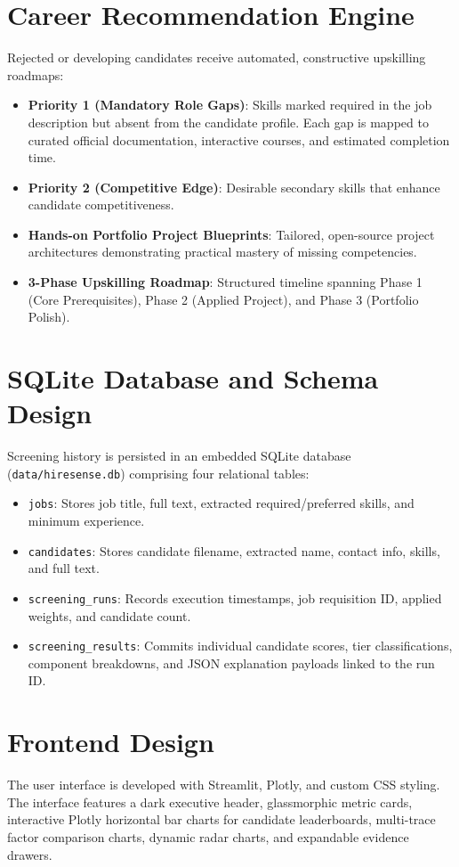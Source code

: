 \documentclass[12pt,a4paper]{report}
\begin{document}
\section{Career Recommendation Engine}
Rejected or developing candidates receive automated, constructive upskilling roadmaps:
\begin{itemize}
    \item \textbf{Priority 1 (Mandatory Role Gaps)}: Skills marked required in the job description but absent from the candidate profile. Each gap is mapped to curated official documentation, interactive courses, and estimated completion time.
    \item \textbf{Priority 2 (Competitive Edge)}: Desirable secondary skills that enhance candidate competitiveness.
    \item \textbf{Hands-on Portfolio Project Blueprints}: Tailored, open-source project architectures demonstrating practical mastery of missing competencies.
    \item \textbf{3-Phase Upskilling Roadmap}: Structured timeline spanning Phase 1 (Core Prerequisites), Phase 2 (Applied Project), and Phase 3 (Portfolio Polish).
\end{itemize}

\section{SQLite Database and Schema Design}
Screening history is persisted in an embedded SQLite database (\texttt{data/hiresense.db}) comprising four relational tables:
\begin{itemize}
    \item \texttt{jobs}: Stores job title, full text, extracted required/preferred skills, and minimum experience.
    \item \texttt{candidates}: Stores candidate filename, extracted name, contact info, skills, and full text.
    \item \texttt{screening\_runs}: Records execution timestamps, job requisition ID, applied weights, and candidate count.
    \item \texttt{screening\_results}: Commits individual candidate scores, tier classifications, component breakdowns, and JSON explanation payloads linked to the run ID.
\end{itemize}

\section{Frontend Design}
The user interface is developed with Streamlit, Plotly, and custom CSS styling. The interface features a dark executive header, glassmorphic metric cards, interactive Plotly horizontal bar charts for candidate leaderboards, multi-trace factor comparison charts, dynamic radar charts, and expandable evidence drawers.
\end{document}
